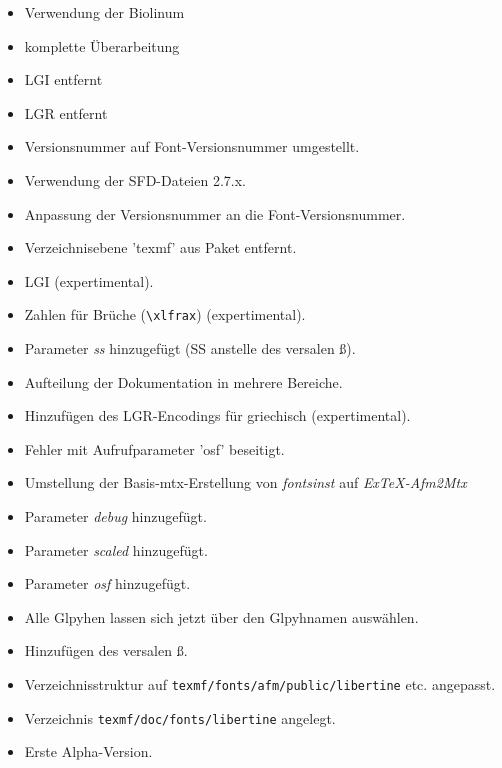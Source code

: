 \documentclass{fontdokuold}
\begin{document}
\begin{description}
\item [29. März 2009]
\begin{itemize}
\item Verwendung der Biolinum
\item komplette Überarbeitung
\item LGI entfernt
\item LGR entfernt
\item Versionsnummer auf Font-Versionsnummer umgestellt.
\end{itemize}
\item [08. Januar 2008]
\begin{itemize}
\item Verwendung der SFD-Dateien 2.7.x.
\item Anpassung der Versionsnummer an die Font-Versionsnummer.
\item Verzeichnisebene 'texmf' aus Paket entfernt.
\item LGI (expertimental).
\item Zahlen für Brüche (\verb|\xlfrax|) (expertimental).
\item Parameter \emph{ss} hinzugefügt (SS anstelle des versalen ß).
\item Aufteilung der Dokumentation in mehrere Bereiche.
\item Hinzufügen des LGR-Encodings für griechisch (expertimental).
\item Fehler mit Aufrufparameter 'osf' beseitigt.
\end{itemize}
\item [11. Juni 2007]
\begin{itemize}
\item Umstellung der Basis-mtx-Erstellung von \emph{fontsinst} auf \emph{ExTeX-Afm2Mtx}
\item Parameter \emph{debug} hinzugefügt.
\item Parameter \emph{scaled} hinzugefügt.
\item Parameter \emph{osf} hinzugefügt.
\item Alle Glpyhen lassen sich jetzt über den Glpyhnamen auswählen.
\item Hinzufügen des versalen ß.
\item Verzeichnisstruktur auf \texttt{texmf/fonts/afm/public/libertine} etc. angepasst.
\item Verzeichnis \texttt{texmf/doc/fonts/libertine} angelegt.
\end{itemize}
\item[1. Mai 2007]
\begin{itemize}
\item Erste Alpha-Version.
\end{itemize}
\end{description}
\end{document}
